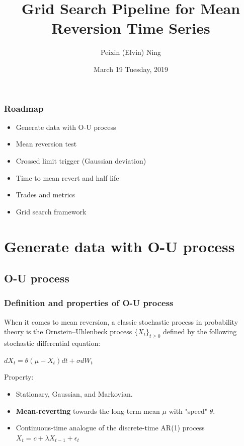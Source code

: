 \documentclass[11pt]{beamer}
\title{Grid Search Pipeline for Mean Reversion Time Series}
\subtitle{}
\author{Peixin (Elvin) Ning}
\institute{\normalsize{peixin.ning@hotmail.com}}
\date{March 19 Tuesday, 2019}
\begin{document}
	
\begin{frame}
\titlepage
\end{frame}

\begin{frame}
\frametitle{Roadmap}
\begin{spacing}{1.5}
	\begin{itemize}
	\item Generate data with O-U process
	\item Mean reversion test 
	\item Crossed limit trigger (Gaussian deviation)
	\item Time to mean revert and half life
	\item Trades and metrics
	\item Grid search framework
\end{itemize}
\end{spacing}

\end{frame}


\section*{Generate data with O-U process}
\subsection*{O-U process}

\begin{frame}
\frametitle{Definition and properties of O-U process}
When it comes to mean reversion, a classic stochastic process in probability theory is the Ornstein--Uhlenbeck process $\{X_t\}_{t \geq 0}$ defined by the following stochastic differential equation{:}
\begin{center}
	 $dX_t =\theta (\mu - X_t)dt + \sigma dW_t$
\end{center}
Property:
	\begin{itemize}
	\item Stationary, Gaussian, and Markovian.
	\item {\bf Mean-reverting} towards the long-term mean $\mu$ with "speed" $\theta$.
	\item  Continuous-time analogue of the discrete-time AR(1) process
	$X_t = c + \lambda X_{t-1} +\epsilon_t$
	\end{itemize}
\end{frame}
\end{document}
